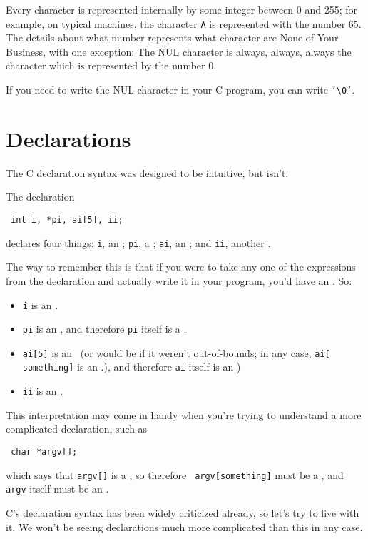 Every character is represented internally by some integer between 0 and
255; for example, on typical machines, the character {\tt A} is
represented with the number 65.  The details about what number
represents what character are None of Your Business, with one exception:
The NUL character is always, always, always the character which is
represented by the number 0.

If you need to write the NUL character in your C program, you can write
{\tt '\verb+\+0'}.  

\section{Declarations}

The C declaration syntax was designed to be intuitive, but isn't.  

The declaration 


\begin{flushleft}
\verb! int i, *pi, ai[5], ii; !
\end{flushleft}

\noindent declares four things:  {\tt i}, an \int; {\tt pi}, a \Int;
{\tt ai}, an \Int; and {\tt ii}, another \int.

The way to remember this is that if you were to take any one of
the expressions from the declaration and actually write it in your
program, you'd have an \int.  So:  
\begin{itemize}
\item {\tt i} is an \int. 
\item  {\tt *pi} is an
\int, and therefore {\tt pi} itself is a \Int. 
\item {\tt ai[5]} is an
\int\ (or would be if it weren't out-of-bounds; in any case, {\tt ai[{\rm
something}]} is an \int.), and therefore {\tt ai} itself is an \ao\Int)
\item {\tt ii} is an \int. 
\end{itemize}

This interpretation may come in handy when you're trying to understand a
more complicated declaration, such as

\begin{flushleft}
\verb! char *argv[]; !
\end{flushleft}

\noindent which says that {\tt *argv[]} is a \chr, so therefore {\tt
argv[{\rm something}]} must be a \Char, and {\tt argv} itself must be
an \ao{\ptr\Char}. 

C's declaration syntax has been widely criticized already, so let's try
to live with it.  We won't be seeing declarations much more complicated
than this in any case.

